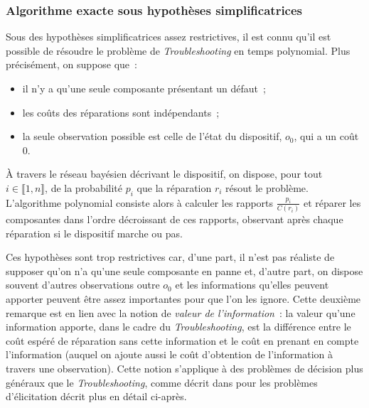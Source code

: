 \documentclass[a4paper,11pt]{article}
\theoremstyle{plain}
\begin{document}
\subsubsection{Algorithme exacte sous hypothèses simplificatrices}

Sous des hypothèses simplificatrices assez restrictives, il est connu \cite{heckerman1994troubleshooting, Heckerman_1995, Vomlelov__2003, L_n_2014} qu'il est possible de résoudre le problème de \emph{Troubleshooting} en temps polynomial. Plus précisément, on suppose que~:
\begin{itemize}
\item il n'y a qu'une seule composante présentant un défaut~;
\item les coûts des réparations sont indépendants~; 
\item la seule observation possible est celle de l'état du dispositif, $o_0$, qui a un coût $0$.
\end{itemize}
À travers le réseau bayésien décrivant le dispositif, on dispose, pour tout $i \in \llbracket 1, n\rrbracket$, de la probabilité $p_i$ que la réparation $r_i$ résout le problème. L'algorithme polynomial consiste alors à calculer les rapports $\frac{p_i}{C(r_i)}$ et réparer les composantes dans l'ordre décroissant de ces rapports, observant après chaque réparation si le dispositif marche ou pas.


Ces hypothèses sont trop restrictives car, d'une part, il n'est pas réaliste de supposer qu'on n'a qu'une seule composante en panne et, d'autre part, on dispose souvent d'autres observations outre $o_0$ et les informations qu'elles peuvent apporter peuvent être assez importantes pour que l'on les ignore. Cette deuxième remarque est en lien avec la notion de \emph{valeur de l'information}~: la valeur qu'une information apporte, dans le cadre du \emph{Troubleshooting}, est la différence entre le coût espéré de réparation sans cette information et le coût en prenant en compte l'information (auquel on ajoute aussi le coût d'obtention de l'information à travers une observation). Cette notion s'applique à des problèmes de décision plus généraux que le \emph{Troubleshooting}, comme décrit dans \cite{Braziunas_2008} pour les problèmes d'élicitation décrit plus en détail ci-après.
\end{document}
